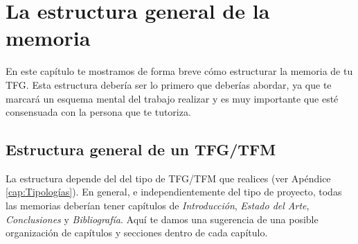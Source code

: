 \chapter{La estructura general de la memoria}
\label{cap:EstructuraMemoria}

En este capítulo te mostramos de forma breve cómo estructurar la memoria de tu TFG. Esta estructura debería ser lo primero que deberías abordar, ya que te marcará un esquema mental del trabajo realizar y es muy importante que esté consensuada con la persona que te tutoriza. 

\section{Estructura general de un TFG/TFM}

La estructura depende del del tipo de TFG/TFM que realices (ver Apéndice \ref{cap:Tipologías}). En general, e independientemente del tipo de proyecto, todas las memorias deberían tener capítulos de \textit{Introducción}, \textit{Estado del Arte}, \textit{Conclusiones} y \textit{Bibliografía}. Aquí te damos una sugerencia de una posible organización de capítulos y secciones dentro de cada capítulo. 

